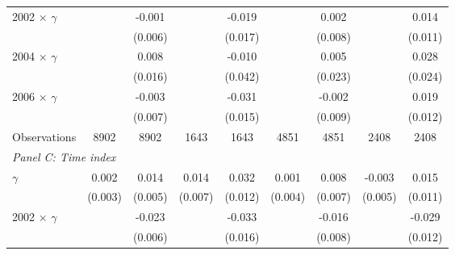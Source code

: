 {\begin{tabular}{l*{8}{c}}
2002 $\times$ $\gamma$&                  &   -0.001         &                  &   -0.019         &                  &    0.002         &                  &    0.014         \\
                &                  &  (0.006)         &                  &  (0.017)         &                  &  (0.008)         &                  &  (0.011)         \\

2004 $\times$ $\gamma$&                  &    0.008         &                  &   -0.010         &                  &    0.005         &                  &    0.028         \\
                &                  &  (0.016)         &                  &  (0.042)         &                  &  (0.023)         &                  &  (0.024)         \\

2006 $\times$ $\gamma$&                  &   -0.003         &                  &   -0.031\sym{**} &                  &   -0.002         &                  &    0.019         \\
                &                  &  (0.007)         &                  &  (0.015)         &                  &  (0.009)         &                  &  (0.012)         \\
\midrule
Observations    &     8902         &     8902         &     1643         &     1643         &     4851         &     4851         &     2408         &     2408         \\

\midrule
\multicolumn{9}{l}{\textit{Panel C: Time index}} \\
$\gamma$        &    0.002         &    0.014\sym{***}&    0.014\sym{**} &    0.032\sym{***}&    0.001         &    0.008         &   -0.003         &    0.015         \\
                &  (0.003)         &  (0.005)         &  (0.007)         &  (0.012)         &  (0.004)         &  (0.007)         &  (0.005)         &  (0.011)         \\


2002 $\times$ $\gamma$&                  &   -0.023\sym{***}&                  &   -0.033\sym{**} &                  &   -0.016\sym{*}  &                  &   -0.029\sym{**} \\
                &                  &  (0.006)         &                  &  (0.016)         &                  &  (0.008)         &                  &  (0.012)         \\


\end{tabular}}
